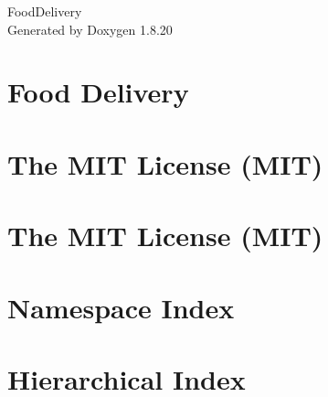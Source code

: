 \let\mypdfximage\pdfximage\def\pdfximage{\immediate\mypdfximage}\documentclass[twoside]{book}
\newcommand{\+}{\discretionary{\mbox{\scriptsize$\hookleftarrow$}}{}{}}
\newcommand{\clearemptydoublepage}{%
  \newpage{\pagestyle{empty}\cleardoublepage}%
}
\begin{document}
\hypersetup{pageanchor=false,
             bookmarksnumbered=true,
             pdfencoding=unicode
            }
\begin{titlepage}
\vspace*{7cm}
\begin{center}%
{\Large Food\+Delivery }\\
\vspace*{1cm}
{\large Generated by Doxygen 1.8.20}\\
\end{center}
\end{titlepage}
\clearemptydoublepage
{}
\tableofcontents
\clearemptydoublepage
{}
\hypersetup{pageanchor=true}

\chapter{Food Delivery}
\label{index}\hypertarget{index}{}
\chapter{The M\+IT License (M\+IT)}
\label{md__c___users__gradn__one_drive__c_s_4790__food_delivery__food_delivery_obj__release_netcoreapp3fb2722082162a479f033393082989e2c}

\chapter{The M\+IT License (M\+IT)}
\label{md__c___users__gradn__one_drive__c_s_4790__food_delivery__food_delivery_wwwroot_lib_jquery-validation__l_i_c_e_n_s_e}

\chapter{Namespace Index}

\chapter{Hierarchical Index}

\end{document}
